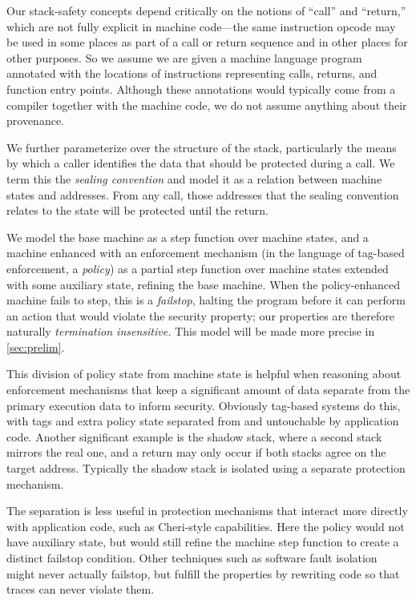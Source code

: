 \documentclass[acmsmall,review,anonymous]{acmart}\settopmatter{printfolios=true,printccs=false,printacmref=false}
\begin{document}
Our stack-safety concepts depend
critically on the notions of ``call'' and ``return,'' which are not fully explicit
in machine code---the same instruction opcode may be used in some places as part of
a call or return sequence and in other places for other purposes.
%
So we assume we are given a machine language program annotated with the locations of
instructions representing calls, returns, and function entry points. Although these
annotations would typically come from a compiler together with the machine code,
we do not assume anything about their provenance.

We further parameterize over the structure of the stack, particularly the means by
which a caller identifies the data that should be protected during a call. We term
this the {\em sealing convention} and model it as a relation between machine states
and addresses. From any call, those addresses that the sealing convention relates to the
state will be protected until the return.

We model the base machine as a step function over machine states, and a machine
enhanced with an enforcement mechanism (in the language of tag-based enforcement,
a {\em policy}) as a partial step function over machine states extended with some
auxiliary state, refining the base machine. When the policy-enhanced machine fails
to step, this is a {\em failstop}, halting the program before it can perform an
action that would violate the security property;
our properties are therefore naturally \emph{termination insensitive.}
This model will be made more precise in \cref{sec:prelim}.

This division of policy state from machine state is helpful when reasoning about
enforcement mechanisms that keep a significant amount of data separate from the
primary execution data to inform security. Obviously tag-based systems do this,
with tags and extra policy state separated from and untouchable by application code.
Another significant example is the shadow stack, where a second stack
mirrors the real one, and a return may only occur if both stacks agree on the
target address. Typically the shadow stack is isolated using a separate protection
mechanism.

The separation is less useful in protection mechanisms that interact more directly
with application code, such as Cheri-style capabilities\citep{??}. Here
the policy would not have auxiliary state, but would still refine the machine step
function to create a distinct failstop condition. Other techniques such as
software fault isolation~\citep{??} might never actually failstop, but fulfill
the properties by rewriting code so that traces can never violate them.
\end{document}

